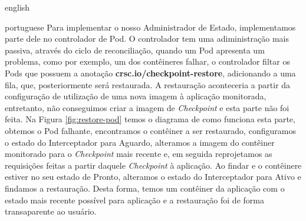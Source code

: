 \begin{otherlanguage*}{english}
\begin{otherlanguage*}{portuguese}
Para implementar o nosso Administrador de Estado, implementamos parte dele no controlador
de Pod. O controlador tem uma adiministração mais passiva, através do ciclo de
reconciliação, quando um Pod apresenta um problema, como por exemplo, um dos contêineres
falhar, o controlador filtar os Pods que possuem a anotação
\textbf{crsc.io/checkpoint-restore}, adicionando a uma fila, que, posteriormente será
restaurada. A restauração aconteceria a partir da configuração de utilização de uma nova
imagem à aplicação monitorada, entretanto, não conseguimos criar a imagem de
\textit{Checkpoint} e esta parte não foi feita. Na Figura \ref{fig:restore-pod} temos o
diagrama de como funciona esta parte, obtemos o Pod falhante, encontramos o contêiner a
ser restaurado, configuramos o estado do Interceptador para Aguardo, alteramos a imagem
do contêiner monitorado para o \textit{Checkpoint} mais recente e, em seguida
reprojetamos as requisições feitas a partir daquele \textit{Checkpoint} à aplicação. Ao
findar e o contêinere estiver no seu estado de Pronto, alteramos o estado do Interceptador
para Ativo e findamos a restauração. Desta forma, temos um contêiner da aplicação com o
estado mais recente possível para aplicação e a restauração foi de forma transaparente ao
usuário.


\end{otherlanguage*}
\end{otherlanguage*}
